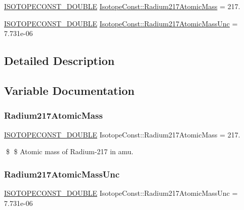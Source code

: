 \begin{DoxyCompactItemize}
\item 
\mbox{\hyperlink{group___isotope_const-_macros_ga8f45a7272ce02c0b4c65c44636ed719a}{I\+S\+O\+T\+O\+P\+E\+C\+O\+N\+S\+T\+\_\+\+D\+O\+U\+B\+LE}} \mbox{\hyperlink{group___isotope_const-_radium-_ra217_gaa317842ccf4880be70ebc6e44518de3c}{Isotope\+Const\+::\+Radium217\+Atomic\+Mass}} = 217.
\item 
\mbox{\hyperlink{group___isotope_const-_macros_ga8f45a7272ce02c0b4c65c44636ed719a}{I\+S\+O\+T\+O\+P\+E\+C\+O\+N\+S\+T\+\_\+\+D\+O\+U\+B\+LE}} \mbox{\hyperlink{group___isotope_const-_radium-_ra217_ga7ed62bf5bec75a7fb6763c3773b8bb0f}{Isotope\+Const\+::\+Radium217\+Atomic\+Mass\+Unc}} = 7.\+731e-\/06
\end{DoxyCompactItemize}


\subsection{Detailed Description}


\subsection{Variable Documentation}
\mbox{\label{group___isotope_const-_radium-_ra217_gaa317842ccf4880be70ebc6e44518de3c}} 
\subsubsection{\texorpdfstring{Radium217\+Atomic\+Mass}{Radium217AtomicMass}}
{\footnotesize\ttfamily \mbox{\hyperlink{group___isotope_const-_macros_ga8f45a7272ce02c0b4c65c44636ed719a}{I\+S\+O\+T\+O\+P\+E\+C\+O\+N\+S\+T\+\_\+\+D\+O\+U\+B\+LE}} Isotope\+Const\+::\+Radium217\+Atomic\+Mass = 217.}

\$ \$ Atomic mass of Radium-\/217 in amu. \mbox{\label{group___isotope_const-_radium-_ra217_ga7ed62bf5bec75a7fb6763c3773b8bb0f}} 
\subsubsection{\texorpdfstring{Radium217\+Atomic\+Mass\+Unc}{Radium217AtomicMassUnc}}
{\footnotesize\ttfamily \mbox{\hyperlink{group___isotope_const-_macros_ga8f45a7272ce02c0b4c65c44636ed719a}{I\+S\+O\+T\+O\+P\+E\+C\+O\+N\+S\+T\+\_\+\+D\+O\+U\+B\+LE}} Isotope\+Const\+::\+Radium217\+Atomic\+Mass\+Unc = 7.\+731e-\/06}

